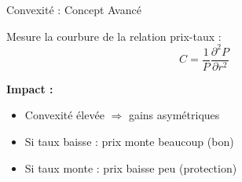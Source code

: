 \documentclass[10pt,aspectratio=169]{beamer}
\begin{document}
\begin{frame}{Convexité : Concept Avancé}
\begin{definition}[Convexité]
Mesure la courbure de la relation prix-taux :
\[
C = \frac{1}{P}\frac{\partial^2 P}{\partial r^2}
\]
\end{definition}

\textbf{Impact :}
\begin{itemize}
    \item Convexité élevée $\Rightarrow$ gains asymétriques
    \item Si taux baisse : prix monte beaucoup (bon)
    \item Si taux monte : prix baisse peu (protection)
\end{itemize}

\vspace{0.3cm}
\begin{center}
\end{center}
\end{frame}
\end{document}
